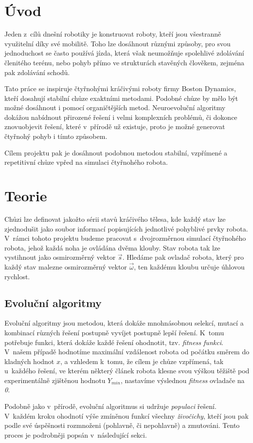 \documentclass[a4]{article}
\begin{document}
\section{Úvod} 
Jeden z~cílů dnešní robotiky je konstruovat roboty, kteří jsou všestranně využitelní díky své mobilitě. Toho lze dosáhnout různými způsoby, pro svou jednoduchost se často používá jízda, která však neumožňuje spolehlivé zdolávání členitého terénu, nebo pohyb přímo ve strukturách stavěných člověkem, zejména pak zdolávání schodů.\par
Tato práce se inspiruje čtyřnohými kráčivými roboty firmy Boston Dynamics\cite{bostondynamics}, kteří dosahují stabilní chůze exaktními metodami.\cite{bdpaper} Podobné chůze by mělo být možné dosáhnout i pomocí organičtějších metod. Neuroevoluční algoritmy dokážou nabídnout přirozené řešení i velmi komplexních problémů, či dokonce znovuobjevit řešení, které v~přírodě už existuje, proto je možné generovat čtyřnohý pohyb i tímto způsobem.\cite{clunegait}\par
Cílem projektu pak je dosáhnout podobnou metodou stabilní, vzpřímené a repetitivní chůze vpřed na simulaci čtyřnohého robota.
 
\section{Teorie}
Chůzi lze definovat jakožto sérii stavů kráčivého tělesa, kde každý stav lze zjednodušit jako soubor informací popisujících jednotlivé pohyblivé prvky robota. V~rámci tohoto projektu budeme pracovat s~dvojrozměrnou simulací čtyřnohého robota, jehož každá noha je ovládána dvěma klouby. Stav robota tak lze vystihnout jako osmirozměrný vektor $\vec{s}$. Hledáme pak ovladač robota, který pro každý stav malezne osmirozměrný vektor $\vec{\omega}$, ten každému kloubu určuje úhlovou rychlost.
\subsection{Evoluční algoritmy}
Evoluční algoritmy jsou metodou, která dokáže mnohnásobnou selekcí, mutací a kombinací různých řešení postupně vyvíjet postupně lepší řešení. K~tomu potřebuje funkci, která dokáže každé řešení ohodnotit, tzv. \emph{fitness funkci}. V~našem případě hodnotíme maximální vzdálenost robota od počátku směrem do kladných hodnot $x$, a vzhledem k~tomu, že cílem je chůze vzpřímená, tak u~každého řešení, ve kterém některý článek robota klesne svou výškou těžiště pod experimentálně zjištěnou hodnotu $Y_{min}$, nastavíme výslednou \emph{fitness} ovladače na \emph{0}.\par
Podobně jako v~přírodě, evoluční algoritmus si udržuje \emph{populaci} řešení. V~každém kroku ohodnotí výše zmíněnou funkcí všechny \emph{živočichy}, kteří jsou pak podle své úspěšnosti rozmnoženi (pohlavně, či nepohlavně) a zmutováni. Tento proces je podrobněji popsán v~následující sekci.
\end{document}
